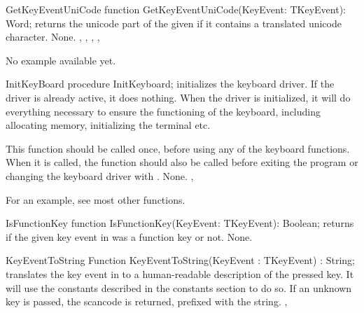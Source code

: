 
\begin{function}{GetKeyEventUniCode}
\Declaration
function GetKeyEventUniCode(KeyEvent: TKeyEvent): Word;
\Description
{} returns the unicode part of the 
given  if it contains a translated unicode 
character.
\Errors
None.
\SeeAlso
{},
, 
,
,
\end{function}

No example available yet.

\begin{procedure}{InitKeyBoard}
\Declaration
procedure InitKeyboard;
\Description
{} initializes the keyboard driver. 
If the driver is already active, it does nothing. When the driver is
initialized, it will do everything necessary to ensure the functioning of
the keyboard, including allocating memory, initializing the terminal etc.

This function should be called once, before using any of the
keyboard functions. When it is called, the  function
should also be called before exiting the program or changing the keyboard
driver with .
\Errors
None.
\SeeAlso
{}, 
\end{procedure}

For an example, see most other functions.

\begin{function}{IsFunctionKey}
\Declaration
function IsFunctionKey(KeyEvent: TKeyEvent): Boolean;
\Description
{} returns  if the given key event
in  was a function key or not.
\Errors
None.
\SeeAlso
{}
\end{function}


\begin{function}{KeyEventToString}
\Declaration
Function KeyEventToString(KeyEvent : TKeyEvent) : String;
\Description
{} translates the key event in  to a
human-readable description of the pressed key. It will use the constants
described in the constants section to do so.
\Errors
If an unknown key is passed, the scancode is returned, prefixed with the 
 string.
\SeeAlso
{}, 
\end{function}

